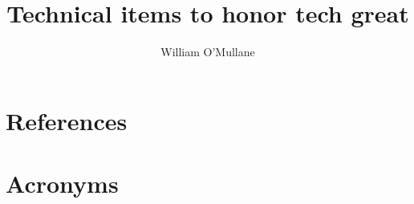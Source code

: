 \documentclass[DM,authoryear,toc]{lsstdoc}
\title{Technical items to honor tech great}
\author{%
William O'Mullane
}
\date{\vcsDate}
\begin{document}
\maketitle


\appendix
\section{References} \label{sec:bib}


\section{Acronyms} \label{sec:acronyms}

\end{document}
